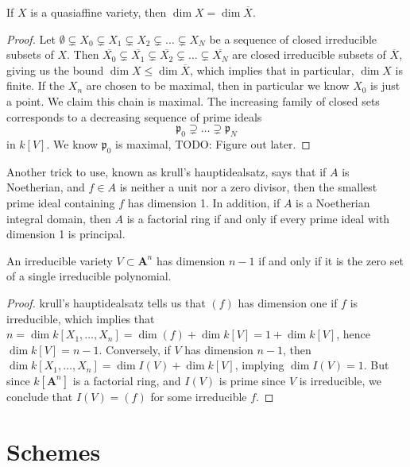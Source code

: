 \begin{theorem}
    If $X$ is a quasiaffine variety, then $\dim X = \dim \overline{X}$.
\end{theorem}
\begin{proof}
    Let $\emptyset \subsetneq X_0 \subsetneq X_1 \subsetneq X_2 \subsetneq \dots \subsetneq X_N$ be a sequence of closed irreducible subsets of $X$. Then $\overline{X_0} \subsetneq \overline{X_1} \subsetneq \overline{X_2} \subsetneq \dots \subsetneq \overline{X_N}$ are closed irreducible subsets of $\overline{X}$, giving us the bound $\dim X \leq \dim \overline{X}$, which implies that in particular, $\dim X$ is finite. If the $X_n$ are chosen to be maximal, then in particular we know $X_0$ is just a point. We claim this chain is maximal. The increasing family of closed sets corresponds to a decreasing sequence of prime ideals
    \[ \mathfrak{p}_0 \supsetneq \dots \supsetneq \mathfrak{p}_N \]
    in $k[V]$. We know $\mathfrak{p}_0$ is maximal, TODO: Figure out later.
\end{proof}

Another trick to use, known as krull's hauptidealsatz, says that if $A$ is Noetherian, and $f \in A$ is neither a unit nor a zero divisor, then the smallest prime ideal containing $f$ has dimension 1. In addition, if $A$ is a Noetherian integral domain, then $A$ is a factorial ring if and only if every prime ideal with dimension 1 is principal.

\begin{theorem}
    An irreducible variety $V \subset \mathbf{A}^n$ has dimension $n-1$ if and only if it is the zero set of a single irreducible polynomial.
\end{theorem}
\begin{proof}
    krull's hauptidealsatz tells us that $(f)$ has dimension one if $f$ is irreducible, which implies that $n = \dim k[X_1,\dots,X_n] = \dim (f) + \dim k[V] = 1 + \dim k[V]$, hence $\dim k[V] = n-1$. Conversely, if $V$ has dimension $n-1$, then $\dim k[X_1,\dots,X_n] = \dim I(V) + \dim k[V]$, implying $\dim I(V) = 1$. But since $k[\mathbf{A}^n]$ is a factorial ring, and $I(V)$ is prime since $V$ is irreducible, we conclude that $I(V) = (f)$ for some irreducible $f$.
\end{proof}

\chapter{Schemes}

